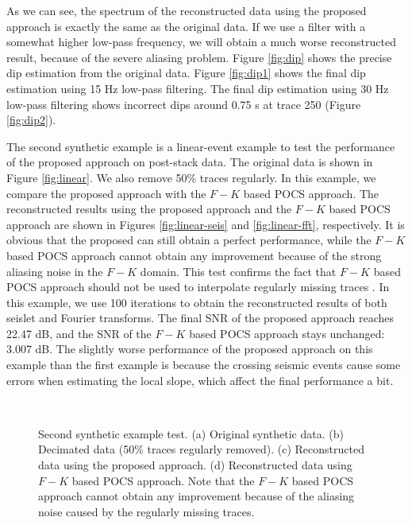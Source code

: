 As we can see, the spectrum of the reconstructed data using the proposed approach is exactly the same as the original data. If we use a filter with a somewhat higher low-pass frequency, we will obtain a much worse reconstructed result, because of the severe aliasing problem. Figure \ref{fig:dip} shows the precise dip estimation from the original data. Figure \ref{fig:dip1} shows the final dip estimation using 15 Hz low-pass filtering. The final dip estimation using 30 Hz low-pass filtering shows incorrect dips around 0.75 s at trace 250 (Figure \ref{fig:dip2}). 

The second synthetic example is a linear-event example to test the performance of the proposed approach on post-stack data. The original data is shown in Figure \ref{fig:linear}. We also remove 50\% traces regularly. In this example, we compare the proposed approach with the $F-K$ based POCS approach. The reconstructed results using the proposed approach and the $F-K$ based POCS approach are shown in Figures \ref{fig:linear-seis} and \ref{fig:linear-fft}, respectively. It is obvious that the proposed can still obtain a perfect performance, while the $F-K$ based POCS approach cannot obtain any improvement because of the strong aliasing noise in the $F-K$ domain. This test confirms the fact that $F-K$ based POCS approach should not be used to interpolate regularly missing traces \cite{spitz1991,mostafa2007,mostafa2010}. In this example, we use 100 iterations to obtain the reconstructed results of both seislet and Fourier transforms. The final SNR of the proposed approach reaches 22.47 dB, and the SNR of the $F-K$ based POCS approach stays unchanged: 3.007 dB. The slightly worse performance of the proposed approach on this example than the first example is because the crossing seismic events cause some errors when estimating the local slope, which affect the final performance a bit.  

\begin{figure}[htb!]
  \centering
    \\
	\caption{Second synthetic example test. (a) Original synthetic data. (b) Decimated data (50\% traces regularly removed). (c) Reconstructed data using the proposed approach. (d) Reconstructed data using $F-K$ based POCS approach. Note that the $F-K$ based POCS approach cannot obtain any improvement because of the aliasing noise caused by the regularly missing traces.}
   \label{fig:linear,linear-zero,linear-seis,linear-fft}
\end{figure}

